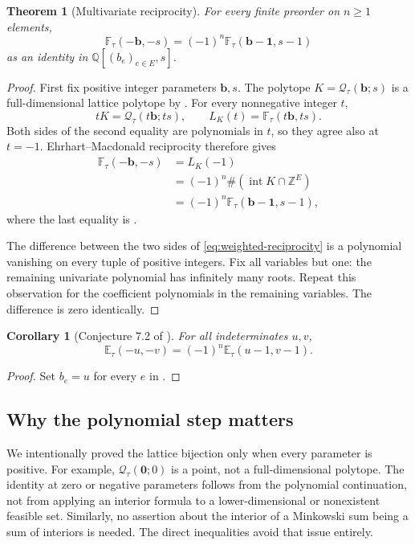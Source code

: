 \documentclass[11pt,letterpaper]{article}
\newtheorem{theorem}{Theorem}[section]
\newtheorem{corollary}[corollary]{Corollary}
\theoremstyle{definition}
\newcommand{\Z}{\mathbb Z}
\newcommand{\Q}{\mathbb Q}
\newcommand{\one}{\mathbf 1}
\newcommand{\zero}{\mathbf 0}
\newcommand{\bvec}{\mathbf b}
\newcommand{\QQ}{\mathcal Q}
\newcommand{\EE}{\mathbb E}
\newcommand{\FF}{\mathbb F}
\DeclareMathOperator{\Int}{int}
\begin{document}
\begin{theorem}[Multivariate reciprocity]\label{thm:reciprocity}
For every finite preorder on $n\geq1$ elements,
\begin{equation}\label{eq:weighted-reciprocity}
 \boxed{\FF_\tau(-\bvec,-s)=(-1)^n\FF_\tau(\bvec-\one,s-1)}
\end{equation}
as an identity in $\Q[(b_e)_{e\in E},s]$.
\end{theorem}
\begin{proof}
First fix positive integer parameters $\bvec,s$. The polytope
$K=\QQ_\tau(\bvec;s)$ is a full-dimensional lattice polytope by
. For every nonnegative integer $t$,
\[
 tK=\QQ_\tau(t\bvec;ts),\qquad
 L_K(t)=\FF_\tau(t\bvec,ts).
\]
Both sides of the second equality are polynomials in $t$, so they agree
also at $t=-1$. Ehrhart--Macdonald reciprocity therefore gives
\begin{align*}
 \FF_\tau(-\bvec,-s)
 &=L_K(-1)\\
 &=(-1)^n\#(\Int K\cap\Z^E)\\
 &=(-1)^n\FF_\tau(\bvec-\one,s-1),
\end{align*}
where the last equality is .

The difference between the two sides of
\eqref{eq:weighted-reciprocity} is a polynomial vanishing on every tuple of
positive integers. Fix all variables but one: the remaining univariate
polynomial has infinitely many roots. Repeat this observation for the
coefficient polynomials in the remaining variables. The difference is zero
identically.
\end{proof}

\begin{corollary}[Conjecture 7.2 of \cite{AC26}]\label{cor:double}
For all indeterminates $u,v$,
\[
 \EE_\tau(-u,-v)=(-1)^n\EE_\tau(u-1,v-1).
\]
\end{corollary}
\begin{proof}
Set $b_e=u$ for every $e$ in .
\end{proof}

\subsection{Why the polynomial step matters}
We intentionally proved the lattice bijection only when every parameter is
positive. For example, $\QQ_\tau(\zero;0)$ is a point, not a full-dimensional
polytope. The identity at zero or negative parameters follows from the
polynomial continuation, not from applying an interior formula to a
lower-dimensional or nonexistent feasible set. Similarly, no assertion
about the interior of a Minkowski sum being a sum of interiors is needed.
The direct inequalities avoid that issue entirely.
\end{document}
